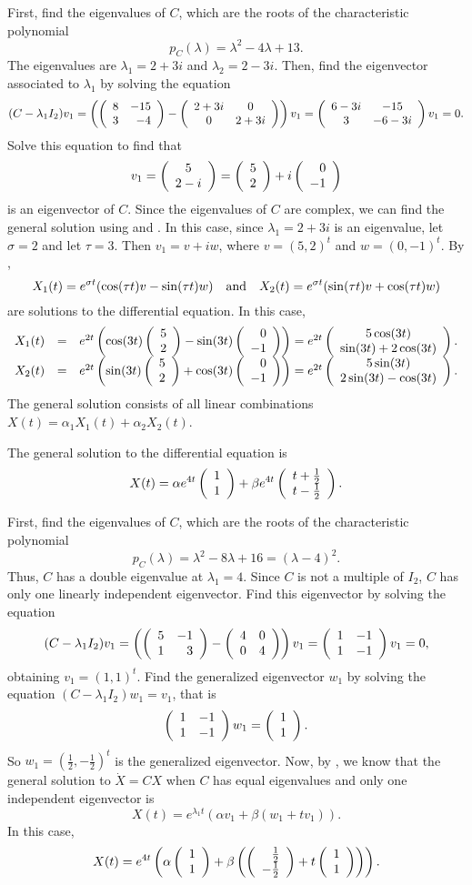 \soln First, find the eigenvalues of $C$, which are the roots of the
characteristic polynomial
\[
p_C(\lambda) = \lambda^2 - 4\lambda + 13.
\]
The eigenvalues are $\lambda_1 = 2 + 3i$ and $\lambda_2 = 2 - 3i$.  Then,
find the eigenvector associated to $\lambda_1$ by solving the equation
\[
(C - \lambda_1I_2)v_1 =
\left(\left(\begin{array}{rr} 8 & -15\\ 3 &-4\end{array}\right) - \left(\begin{array}{cc} 2 + 3i & 0\\ 0 &2 + 3i\end{array}\right)\right)v_1
= \left(\begin{array}{cc} 6 - 3i & -15\\ 3 &-6 - 3i\end{array}\right)v_1 = 0.
\]
Solve this equation to find that
\[
v_1 = \left(\begin{array}{c} 5 \\ 2 - i\end{array}\right) = \left(\begin{array}{r} 5 \\ 2\end{array}\right) + i\left(\begin{array}{r} 0 \\ -1\end{array}\right)
\]
is an eigenvector of $C$.  Since the eigenvalues of $C$ are complex, we
can find the general solution using  and .  In this
case, since $\lambda_1 = 2 + 3i$ is
an eigenvalue, let $\sigma = 2$ and let $\tau = 3$.  Then $v_1 = v + iw$,
where $v = (5,2)^t$ and $w = (0,-1)^t$.  By ,
\[
X_1(t) = e^{\sigma t}(\cos(\tau t)v - \sin(\tau t)w) \quad\mbox{and}\quad
X_2(t) = e^{\sigma t}(\sin(\tau t)v + \cos(\tau t)w)
\]
are solutions to the differential equation.  In this case,
\[
\begin{array}{rcl}
X_1(t) & = & e^{2t}\left(\cos(3t)\left(\begin{array}{r} 5 \\ 2\end{array}\right) -
\sin(3t)\left(\begin{array}{r} 0 \\ -1\end{array}\right)\right)
= e^{2t}\left(\begin{array}{c} 5\cos(3t) \\ \sin(3t) + 2\cos(3t)\end{array}\right). \\
X_2(t) & = & e^{2t}\left(\sin(3t)\left(\begin{array}{r} 5 \\ 2\end{array}\right) +
\cos(3t)\left(\begin{array}{r} 0 \\ -1\end{array}\right)\right)
= e^{2t}\left(\begin{array}{c} 5\sin(3t) \\ 2\sin(3t) - \cos(3t)\end{array}\right).
\end{array}
\]
The general solution consists of all linear combinations
$X(t) = \alpha_1X_1(t) + \alpha_2X_2(t)$.


 \ans The general solution to the differential equation is
\[
X(t) = \alpha e^{4t}\left(\begin{array}{r} 1 \\ 1\end{array}\right) + \beta e^{4t}\left(\begin{array}{c} t + \frac{1}{2} \\ t - \frac{1}{2}\end{array}\right).
\]

\soln First, find the eigenvalues of $C$, which are the roots of the
characteristic polynomial
\[
p_C(\lambda) = \lambda^2 - 8\lambda + 16 = (\lambda - 4)^2.
\]
Thus, $C$ has a double eigenvalue at $\lambda_1 = 4$.  Since $C$ is not
a multiple of $I_2$, $C$ has only one linearly independent eigenvector.
Find this eigenvector by solving the equation
\[
(C - \lambda_1I_2)v_1 = \left(\left(\begin{array}{rr} 5 & -1\\ 1 &3\end{array}\right) - \left(\begin{array}{rr} 4 & 0\\ 0 &4\end{array}\right)
\right)v_1 = \left(\begin{array}{rr} 1 & -1\\ 1 &-1\end{array}\right)v_1 = 0,
\]
obtaining $v_1 = (1,1)^t$.  Find the generalized eigenvector $w_1$ by
solving the equation $(C - \lambda_1 I_2)w_1 = v_1$, that is
\[
\left(\begin{array}{rr} 1 & -1\\ 1 &-1\end{array}\right)w_1 = \left(\begin{array}{r} 1 \\ 1\end{array}\right).
\]
So $w_1 = (\frac{1}{2},-\frac{1}{2})^t$ is the generalized eigenvector.
Now, by , we know that the
general solution to $\dot{X} = CX$ when $C$ has equal eigenvalues and only
one independent eigenvector is
\[
X(t) = e^{\lambda_1 t}(\alpha v_1 + \beta(w_1 + tv_1)).
\]
In this case,
\[
X(t) = e^{4t}\left(\alpha \left(\begin{array}{r} 1 \\ 1\end{array}\right) + \beta\left(\left(\begin{array}{r} \frac{1}{2} \\ -\frac{1}{2}\end{array}\right) + t\left(\begin{array}{r} 1 \\ 1\end{array}\right)\right)\right).
\]



